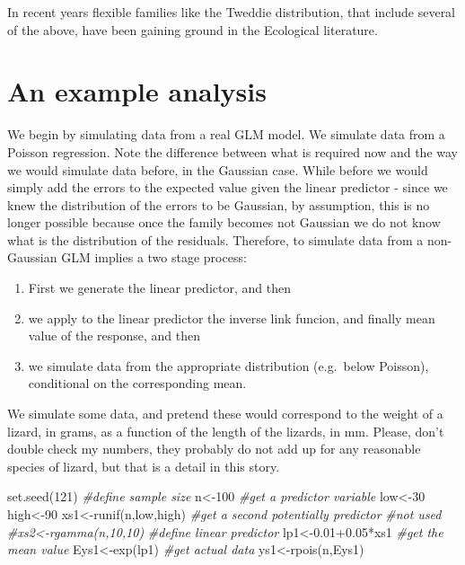 \documentclass[
]{book}
\newenvironment{Shaded}{\begin{snugshade}}{\end{snugshade}}
\newcommand{\CommentTok}[1]{\textcolor[rgb]{0.56,0.35,0.01}{\textit{#1}}}
\newcommand{\DecValTok}[1]{\textcolor[rgb]{0.00,0.00,0.81}{#1}}
\newcommand{\FloatTok}[1]{\textcolor[rgb]{0.00,0.00,0.81}{#1}}
\newcommand{\FunctionTok}[1]{\textcolor[rgb]{0.00,0.00,0.00}{#1}}
\newcommand{\NormalTok}[1]{#1}
\newcommand{\OtherTok}[1]{\textcolor[rgb]{0.56,0.35,0.01}{#1}}
\newcommand{\SpecialCharTok}[1]{\textcolor[rgb]{0.00,0.00,0.00}{#1}}
\providecommand{\tightlist}{%
  \setlength{\itemsep}{0pt}\setlength{\parskip}{0pt}}
\begin{document}
In recent years flexible families like the Tweddie distribution, that include several of the above, have been gaining ground in the Ecological literature.

\hypertarget{an-example-analysis}{%
\section{An example analysis}\label{an-example-analysis}}

We begin by simulating data from a real GLM model. We simulate data from a Poisson regression. Note the difference between what is required now and the way we would simulate data before, in the Gaussian case. While before we would simply add the errors to the expected value given the linear predictor - since we knew the distribution of the errors to be Gaussian, by assumption, this is no longer possible because once the family becomes not Gaussian we do not know what is the distribution of the residuals. Therefore, to simulate data from a non-Gaussian GLM implies a two stage process:

\begin{enumerate}
\def\labelenumi{\arabic{enumi}.}
\tightlist
\item
  First we generate the linear predictor, and then
\item
  we apply to the linear predictor the inverse link funcion, and finally
  mean value of the response, and then
\item
  we simulate data from the appropriate distribution (e.g.~below Poisson), conditional on the corresponding mean.
\end{enumerate}

We simulate some data, and pretend these would correspond to the weight of a lizard, in grams, as a function of the length of the lizards, in mm. Please, don't double check my numbers, they probably do not add up for any reasonable species of lizard, but that is a detail in this story.

\begin{Shaded}
\begin{Highlighting}[]
\FunctionTok{set.seed}\NormalTok{(}\DecValTok{121}\NormalTok{)}
\CommentTok{\#define sample size}
\NormalTok{n}\OtherTok{\textless{}{-}}\DecValTok{100}
\CommentTok{\#get a predictor variable}
\NormalTok{low}\OtherTok{\textless{}{-}}\DecValTok{30}
\NormalTok{high}\OtherTok{\textless{}{-}}\DecValTok{90}
\NormalTok{xs1}\OtherTok{\textless{}{-}}\FunctionTok{runif}\NormalTok{(n,low,high)}
\CommentTok{\#get a second potentially predictor}
\CommentTok{\#not used}
\CommentTok{\#xs2\textless{}{-}rgamma(n,10,10)}
\CommentTok{\#define linear predictor}
\NormalTok{lp1}\OtherTok{\textless{}{-}}\FloatTok{0.01+0.05}\SpecialCharTok{*}\NormalTok{xs1}
\CommentTok{\#get the mean value}
\NormalTok{Eys1}\OtherTok{\textless{}{-}}\FunctionTok{exp}\NormalTok{(lp1)}
\CommentTok{\#get actual data}
\NormalTok{ys1}\OtherTok{\textless{}{-}}\FunctionTok{rpois}\NormalTok{(n,Eys1)}
\end{Highlighting}
\end{Shaded}
\end{document}
